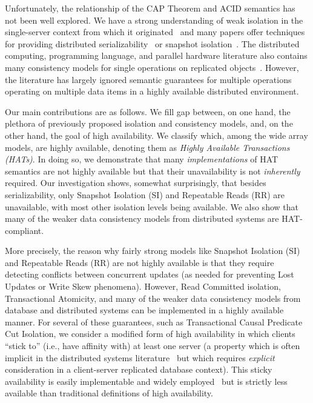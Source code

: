 Unfortunately, the relationship of the CAP Theorem and ACID semantics
has not been well explored. We have a strong understanding of weak
isolation in the single-server context from which it
originated~\cite{adya, ansicritique, gray-isolation} and many papers
offer techniques for providing distributed
serializability~\cite{bernstein-concurrency, kemme-classification,
  spanner, granola, daudjee-session, krikellas-bargain, calvin} or
snapshot isolation~\cite{daudjee-snapshot,generalizedsnapshot,
  kemme-snapshot, walter}. The distributed computing, programming
language, and parallel hardware literature also contains many
consistency models for single operations on replicated
objects~\cite{pnuts, herlihy-art, cops, eiger, cac, sessionguarantees,
  ceri-mechanism, chen-mechanism}. However, the literature has largely
ignored semantic guarantees for multiple operations operating on
multiple data items in a highly available distributed environment.

Our main contributions are as follows. We fill gap between, on one
hand, the plethora of previously proposed isolation and consistency
models, and, on the other hand, the goal of high availability.  We
classify which, among the wide array models, are highly available,
denoting them as {\em Highly Available Transactions (HATs)}. In doing
so, we demonstrate that many \textit{implementations} of HAT semantics
are not highly available but that their unavailability is not
\textit{inherently} required. Our investigation shows, somewhat
surprisingly, that besides serializability, only Snapshot Isolation
(SI) and Repeatable Reads (RR) are unavailable, with most other
isolation levels being available. We also show that many of the weaker
data consistency models from distributed systems are HAT-compliant.

More precisely, the reason why fairly strong models like Snapshot
Isolation (SI) and Repeatable Reads (RR) are not highly available is
that they require detecting conflicts between concurrent updates (as
needed for preventing Lost Updates or Write Skew phenomena). However,
Read Committed isolation, Transactional Atomicity, and many of the
weaker data consistency models from database and distributed systems
can be implemented in a highly available manner. For several of these
guarantees, such as Transactional Causal Predicate Cut Isolation, we
consider a modified form of high availability in which clients ``stick
to'' (i.e., have affinity with) at least one server (a property which
is often implicit in the distributed systems
literature~\cite{herlihy-art, cops, eiger, cac} but which requires
\textit{explicit} consideration in a client-server replicated database
context). This sticky availability is easily implementable and
widely employed~\cite{cops, eiger, vogels-defs} but is strictly less
available than traditional definitions of high availability.

